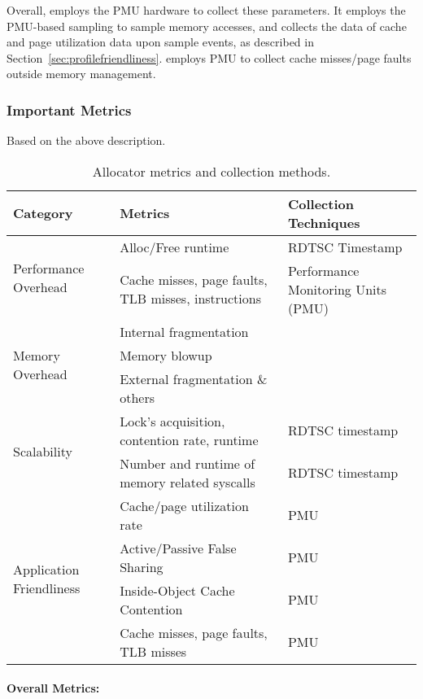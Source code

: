 Overall, \MP{} employs the PMU hardware to collect these parameters. It employs the PMU-based sampling to sample memory accesses, and collects the data of cache and page utilization data upon sample events, as described in Section~\ref{sec:profilefriendliness}. \MP{} employs PMU to collect cache misses/page faults outside memory management.

\subsubsection{Important Metrics}


Based on the above description. 
\begin{table}[h]
  \centering
  \footnotesize
\begin{tabular}{l | l | l}
\hline
Category & Metrics & Collection Techniques \\ \hline
\multirow{2}{*}{Performance Overhead} & {Alloc/Free runtime} & RDTSC Timestamp\\ \cline{2-3}
& {Cache misses, page faults, TLB misses, instructions} & Performance Monitoring Units (PMU) \\ \hline
\multirow{3}{*}{Memory Overhead} & Internal fragmentation & \\ \cline{2-3}
	& Memory blowup &  \\ \cline{2-3}
& {External fragmentation \& others} &  \\ \hline
\multirow{2}{*}{Scalability} & Lock's acquisition, contention rate, runtime & RDTSC timestamp\\ \cline{2-3}
& {Number and runtime of memory related syscalls} &  RDTSC timestamp \\ \hline
\multirow{4}{*}{Application Friendliness} & Cache/page utilization rate & PMU  \\ \cline{2-3}
& Active/Passive False Sharing &  PMU\\ \cline{2-3}
& Inside-Object Cache Contention &  PMU \\ \cline{2-3}
& Cache misses, page faults, TLB misses & PMU\\ \hline
  \end{tabular}
  \centering
  \caption{Allocator metrics and collection methods.\label{table:alldata}}
\end{table}

\paragraph{Overall Metrics:} 


